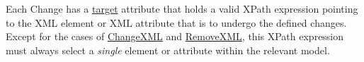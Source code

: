 Each Change has a \hyperref[sec:target]{target} attribute that holds a valid XPath expression pointing to the XML element or XML attribute that is to undergo the defined changes.
Except for the cases of \hyperref[class:changeXml]{ChangeXML} and \hyperref[class:removeXml]{RemoveXML}, this XPath expression must always select a \emph{single} element or attribute within the relevant model.

  

  

  

  

  

  


